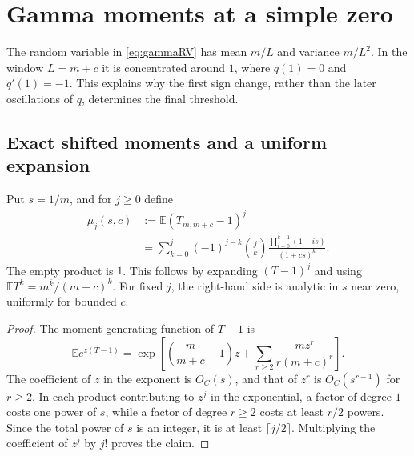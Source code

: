 \documentclass[11pt]{article}
\numberwithin{equation}{section}
\newtheorem{lemma}[theorem]{Lemma}
\theoremstyle{definition}
\newcommand{\E}{\mathbb E}
\newcommand{\rf}[2]{#1^{\overline{#2}}}
\begin{document}
\section{Gamma moments at a simple zero}\label{sec:moments}

The random variable in \eqref{eq:gammaRV} has mean $m/L$ and variance
$m/L^2$. In the window $L=m+c$ it is concentrated around $1$, where
$q(1)=0$ and $q'(1)=-1$. This explains why the first sign change, rather
than the later oscillations of $q$, determines the final threshold.

\subsection{Exact shifted moments and a uniform expansion}
Put $s=1/m$, and for $j\ge0$ define
\begin{equation}\label{eq:mu}
 \begin{split}
 \mu_j(s,c)
  &:=\E(T_{m,m+c}-1)^j\\
  &=\sum_{k=0}^j(-1)^{j-k}\binom jk
    \frac{\prod_{i=0}^{k-1}(1+is)}{(1+cs)^k}.
 \end{split}
\end{equation}
The empty product is $1$. This follows by expanding $(T-1)^j$ and using
$\E T^k=\rf{m}{k}/(m+c)^k$. For fixed $j$, the right-hand side is analytic
in $s$ near zero, uniformly for bounded $c$.

\begin{proof}
The moment-generating function of $T-1$ is
\[
 \E e^{z(T-1)}
 =\exp\left[\left(\frac m{m+c}-1\right)z
             +\sum_{r\ge2}\frac{m z^r}{r(m+c)^r}\right].
\]
The coefficient of $z$ in the exponent is $O_C(s)$, and that of $z^r$
is $O_C(s^{r-1})$ for $r\ge2$. In each product contributing to $z^j$
in the exponential, a factor of degree $1$ costs one power of $s$, while
a factor of degree $r\ge2$ costs at least $r/2$ powers. Since the total
power of $s$ is an integer, it is at least $\lceil j/2\rceil$.
Multiplying the coefficient of $z^j$ by $j!$ proves the claim.
\end{proof}
\end{document}
